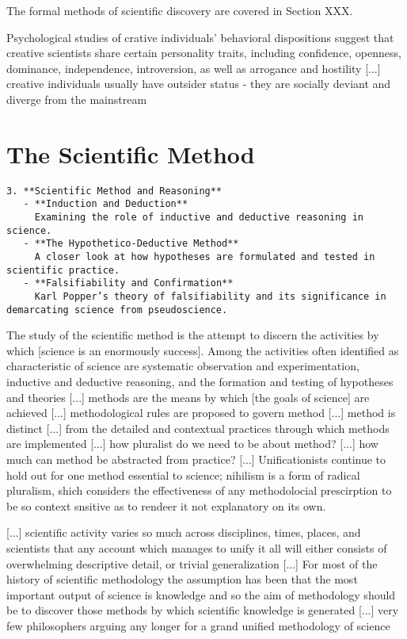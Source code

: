 The formal methods of scientific discovery are covered in Section XXX.

{\color{red} Psychological studies of crative individuals' behavioral dispositions suggest that creative scientists share certain personality traits, including confidence, openness, dominance, independence, introversion, as well as arrogance and hostility [...] creative individuals usually have outsider status - they are socially deviant and diverge from the mainstream}


%
%

\section{The Scientific Method}

\begin{verbatim}
3. **Scientific Method and Reasoning**  
   - **Induction and Deduction**  
     Examining the role of inductive and deductive reasoning in science.
   - **The Hypothetico-Deductive Method**  
     A closer look at how hypotheses are formulated and tested in scientific practice.
   - **Falsifiability and Confirmation**  
     Karl Popper’s theory of falsifiability and its significance in demarcating science from pseudoscience.
\end{verbatim}

{\color{red} The study of the scientific method is the attempt to discern the activities by which [science is an enormously success]. Among the activities often identified as characteristic of science are systematic observation and experimentation, inductive and deductive reasoning, and the formation and testing of hypotheses and theories [...] methods are the means by which [the goals of science] are achieved [...] methodological rules are proposed to govern method [...] method is distinct [...] from the detailed and contextual practices through which methods are implemented [...] how pluralist do we need to be about method? [...] how much can method be abstracted from practice? [...] Unificationists continue to hold out for one method essential to science; nihilism is a form of radical pluralism, shich considers the effectiveness of any methodolocial prescirption to be so context snsitive as to rendeer it not explanatory on its own.}

{\color{red} [...] scientific activity varies so much across disciplines, times, places, and scientists that any account which manages to unify it all will either consists of overwhelming descriptive detail, or trivial generalization [...] For most of the history of scientific methodology the assumption has been that the most important output of science is knowledge and so the aim of methodology should be to discover those methods by which scientific knowledge is generated [...] very few philosophers arguing any longer for a grand unified methodology of science}

